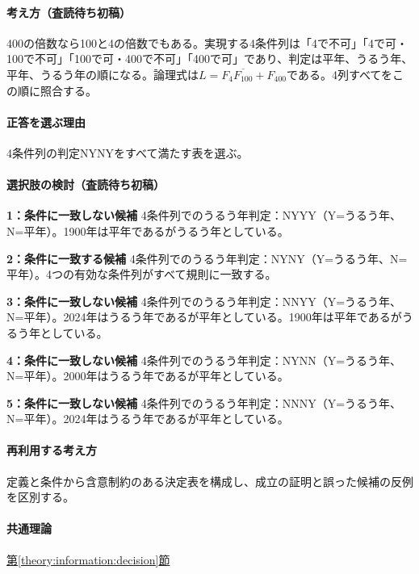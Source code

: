\paragraph{考え方（査読待ち初稿）} 400の倍数なら100と4の倍数でもある。実現する4条件列は「4で不可」「4で可・100で不可」「100で可・400で不可」「400で可」であり、判定は平年、うるう年、平年、うるう年の順になる。論理式は\(L=F_4\overline{F_{100}}+F_{400}\)である。4列すべてをこの順に照合する。

\paragraph{正答を選ぶ理由} 4条件列の判定NYNYをすべて満たす表を選ぶ。

\paragraph{選択肢の検討（査読待ち初稿）}\mbox{}\par

\noindent\textbf{1：条件に一致しない候補} 4条件列でのうるう年判定：NYYY（Y=うるう年、N=平年）。1900年は平年であるがうるう年としている。\par

\noindent\textbf{2：条件に一致する候補} 4条件列でのうるう年判定：NYNY（Y=うるう年、N=平年）。4つの有効な条件列がすべて規則に一致する。\par

\noindent\textbf{3：条件に一致しない候補} 4条件列でのうるう年判定：NNYY（Y=うるう年、N=平年）。2024年はうるう年であるが平年としている。1900年は平年であるがうるう年としている。\par

\noindent\textbf{4：条件に一致しない候補} 4条件列でのうるう年判定：NYNN（Y=うるう年、N=平年）。2000年はうるう年であるが平年としている。\par

\noindent\textbf{5：条件に一致しない候補} 4条件列でのうるう年判定：NNNY（Y=うるう年、N=平年）。2024年はうるう年であるが平年としている。\par

\paragraph{再利用する考え方} 定義と条件から含意制約のある決定表を構成し、成立の証明と誤った候補の反例を区別する。

\paragraph{共通理論} \hyperref[theory:information:decision]{第\ref*{theory:information:decision}節}

